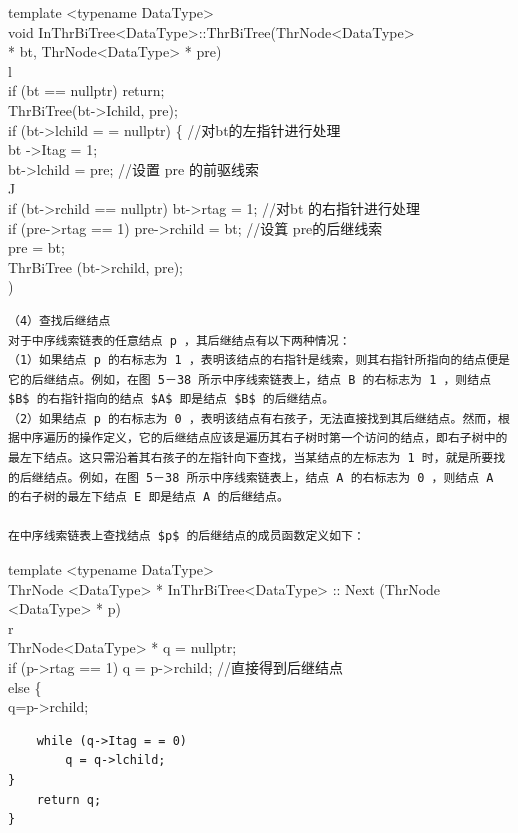 \documentclass[10pt]{article}
\begin{document}
template <typename DataType>\\
void InThrBiTree<DataType>::ThrBiTree(ThrNode<DataType>\\
* bt, ThrNode<DataType> * pre)\\
l\\
if (bt == nullptr) return;\\
ThrBiTree(bt->Ichild, pre);\\
if (bt->lchild = = nullptr) \{ //对bt的左指针进行处理\\
bt ->Itag = 1;\\
bt->lchild = pre; //设置 pre 的前驱线索\\
J\\
if (bt->rchild == nullptr) bt->rtag = 1; //对bt 的右指针进行处理\\
if (pre->rtag == 1) pre->rchild = bt; //设䈯 pre的后继线索\\
pre = bt;\\
ThrBiTree (bt->rchild, pre);\\
)

\begin{verbatim}
（4）查找后继结点
对于中序线索链表的任意结点 p ，其后继结点有以下两种情况：
（1）如果结点 p 的右标志为 1 ，表明该结点的右指针是线索，则其右指针所指向的结点便是它的后继结点。例如，在图 5－38 所示中序线索链表上，结点 B 的右标志为 1 ，则结点 $B$ 的右指针指向的结点 $A$ 即是结点 $B$ 的后继结点。
（2）如果结点 p 的右标志为 0 ，表明该结点有右孩子，无法直接找到其后继结点。然而，根据中序遍历的操作定义，它的后继结点应该是遍历其右子树时第一个访问的结点，即右子树中的最左下结点。这只需沿着其右孩子的左指针向下查找，当某结点的左标志为 1 时，就是所要找的后继结点。例如，在图 5－38 所示中序线索链表上，结点 A 的右标志为 0 ，则结点 A 的右子树的最左下结点 E 即是结点 A 的后继结点。

在中序线索链表上查找结点 $p$ 的后继结点的成员函数定义如下：
\end{verbatim}

template <typename DataType>\\
ThrNode <DataType> * InThrBiTree<DataType> :: Next (ThrNode\\
<DataType> * p)\\
r\\
ThrNode<DataType> * q = nullptr;\\
if (p->rtag == 1) q = p->rchild; //直接得到后继结点\\
else \{\\
q=p->rchild;

\begin{verbatim}
    while (q->Itag = = 0)
        q = q->lchild;
}
    return q;
}
\end{verbatim}
\end{document}
